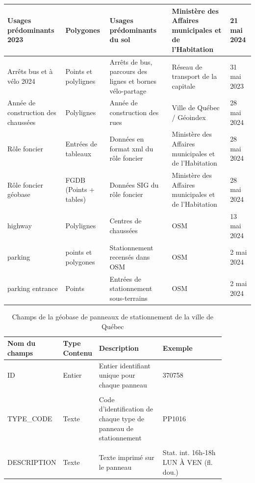 \begin{landscape}
\begin{longtable}[h!]{p{.2 \linewidth} p{.1 \linewidth} p{.3 \linewidth} p{.15\linewidth} p{.125\linewidth} }
        \hline
        Usages prédominants 2023  & Polygones & Usages prédominants du sol &   Ministère des Affaires municipales et de l'Habitation & 21 mai 2024 \\
        \hline
        Arrêts bus et à vélo 2024 & Points et polylignes & Arrêts de bus, parcours des lignes et bornes vélo-partage & Réseau de transport de la capitale & 31 mai 2023 \\
        \hline
        Année de construction des chaussées & Polylignes & Année de construction des rues & Ville de Québec / Géoindex & 28 mai 2024 \\
        \hline
        Rôle foncier & Entrées de tableaux & Données en format xml du rôle foncier & Ministère des Affaires municipales et de l'Habitation & 28 mai 2024 \\
        \hline
        Rôle foncier géobase & FGDB (Points + tables) & Données SIG du rôle foncier & Ministère des Affaires municipales et de l'Habitation & 28 mai 2024 \\
        \hline
        highway & Polylignes & Centres de chaussées & \ac{OSM} & 13 mai 2024\\
        \hline
        parking & points et polygones & Stationnement recensés dans \ac{OSM} & \ac{OSM} & 2 mai 2024 \\
        \hline
          parking entrance & Points & Entrées de stationnement sous-terrains  & \ac{OSM} & 2 mai 2024 \\
          \hline
        
      \end{longtable}

      \begin{table}[h!]
        \centering
        \begin{tabular}{p{0.18\linewidth} | p{0.1\linewidth} | p{0.3\linewidth} | p{0.3\linewidth}} 
        \hline
        Nom du champs & Type Contenu & Description  & Exemple\\ 
        \hline
        ID             & Entier    & Entier identifiant unique pour chaque panneau  & 370758 \\ 
        & & & \\
        TYPE\_CODE      & Texte     & Code d'identification de chaque type de panneau de stationnement & PP1016\\
        & & & \\
        DESCRIPTION     & Texte     & Texte imprimé sur le panneau & Stat. int. 16h-18h LUN À VEN (fl. dou.)\\
        \hline
        \end{tabular}
        \caption{Champs de la géobase de panneaux de stationnement de la ville de Québec \parencite{VilledeQuebec:PanneauxSignalisation:2024}}
        \label{tab:champs_geobase_stationnement_quebec}
      \end{table}
      \end{landscape}
